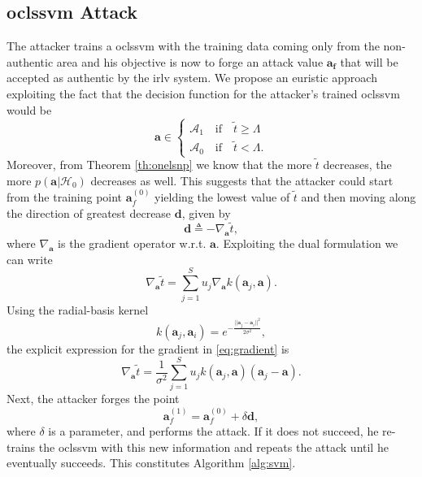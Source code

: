 \documentclass[draftcls,onecolumn,12pt]{IEEEtran}
\newcommand{\wrt}{w.r.t. }
\begin{document}
\subsection{\Acl{oclssvm} Attack}
The attacker trains a \ac{oclssvm} with the training data coming only from the non-authentic area and his objective is now to forge an attack value $\mathbf{a_{f}}$ that will be accepted as authentic by the \ac{irlv} system. We propose an euristic approach  exploiting the fact that the decision function for the attacker's trained \ac{oclssvm} would be
\begin{equation}
\mathbf{a} \in
	\begin{cases}
		\mathcal{A}_1 \quad \text{if} \quad \tilde{t} \geq \Lambda \\
		\mathcal{A}_0 \quad \text{if} \quad \tilde{t} < \Lambda.
	\end{cases}	
\end{equation} 
Moreover, from Theorem \ref{th:onelsnp} we know that the more $\tilde{t}$ decreases, the more $p(\mathbf{a}|\mathcal{H}_0)$ decreases as well.
This suggests that the attacker could start from the training point $\mathbf{a}_{f}^{(0)}$ yielding the lowest value of $\tilde{t}$ and then moving along the direction of greatest decrease $\mathbf{d}$, given by
\begin{equation}
\label{eq:dDef}
	\mathbf{d} \triangleq - \nabla_{\mathbf{a}} \tilde{t},
\end{equation} 
where $\nabla_{\mathbf{a}}$ is the gradient operator \wrt $\mathbf{a}$. Exploiting the dual formulation \cite{choi2009least} we can write
\begin{equation}
\label{eq:gradient}
		\nabla_{\mathbf{a}} \tilde{t} = \sum_{j=1}^{S} u_j \nabla_{\mathbf{a}} k(\mathbf{a}_j,\mathbf{a}).
\end{equation}
Using the radial-basis kernel
\begin{equation}
k(\mathbf{a}_j,\mathbf{a}_i) = e^{-\frac{||\mathbf{a}_j-\mathbf{a}_i||^2}{2\sigma^2}},
\end{equation}
the explicit expression for the gradient in \eqref{eq:gradient} is
\begin{equation}
	\nabla_{\mathbf{a}} \tilde{t} =\frac{1}{\sigma^2} \sum_{j=1}^{S} u_j k(\mathbf{a}_j,\mathbf{a}) (\mathbf{a}_j - \mathbf{a}).
\end{equation}
Next, the attacker forges the point
\begin{equation}
	\mathbf{a}_f^{(1)} = \mathbf{a}_f^{(0)} + \delta \mathbf{d}, 	
\end{equation}
where $\delta$ is a parameter, and performs the attack. If it does not succeed, he re-trains the \ac{oclssvm} with this new information and repeats the attack until he eventually succeeds. This constitutes Algorithm \ref{alg:svm}.
\end{document}
